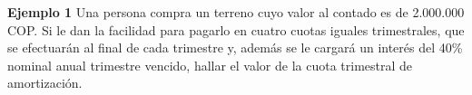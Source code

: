 	\textbf{Ejemplo 1}\newline
	Una persona compra un terreno cuyo valor al contado es de 2.000.000 COP. Si le dan la facilidad para pagarlo en cuatro cuotas iguales trimestrales, que se efectuarán al final de cada trimestre y, además se le cargará un interés del 40\% nominal anual trimestre vencido, hallar el valor de la cuota trimestral de amortización.\\ \\

